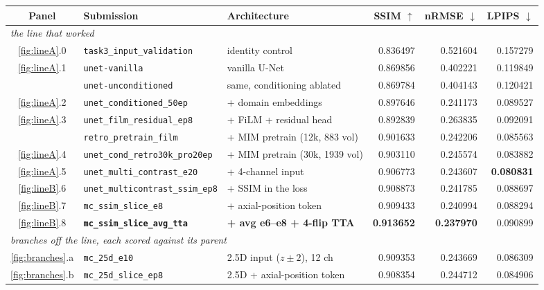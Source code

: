\documentclass[10pt,a4paper]{article}
\begin{document}
\begin{table}[H]
\centering
\small\setlength{\tabcolsep}{4pt}
\begin{tabular}{cllrrr}
\toprule
Panel & Submission & Architecture & SSIM $\uparrow$ & nRMSE $\downarrow$ & LPIPS $\downarrow$ \\
\midrule
\multicolumn{6}{l}{\itshape the line that worked} \\
\ref{fig:lineA}.0 & \texttt{task3\_input\_validation}      & identity control                & 0.836497 & 0.521604 & 0.157279 \\
\ref{fig:lineA}.1 & \texttt{unet-vanilla}                  & vanilla U-Net                   & 0.869856 & 0.402221 & 0.119849 \\
    & \texttt{unet-unconditioned}            & same, conditioning ablated      & 0.869784 & 0.404143 & 0.120421 \\
\ref{fig:lineA}.2 & \texttt{unet\_conditioned\_50ep}       & + domain embeddings             & 0.897646 & 0.241173 & 0.089527 \\
\ref{fig:lineA}.3 & \texttt{unet\_film\_residual\_ep8}     & + FiLM + residual head          & 0.892839 & 0.263835 & 0.092091 \\
    & \texttt{retro\_pretrain\_film}         & + MIM pretrain (12k, 883 vol)   & 0.901633 & 0.242206 & 0.085563 \\
\ref{fig:lineA}.4 & \texttt{unet\_cond\_retro30k\_pro20ep} & + MIM pretrain (30k, 1939 vol)  & 0.903110 & 0.245574 & 0.083882 \\
\ref{fig:lineA}.5 & \texttt{unet\_multi\_contrast\_e20}    & + 4-channel input               & 0.906773 & 0.243607 & \textbf{0.080831} \\
\ref{fig:lineB}.6 & \texttt{unet\_multicontrast\_ssim\_ep8}& + SSIM in the loss              & 0.908873 & 0.241785 & 0.088697 \\
\ref{fig:lineB}.7 & \texttt{mc\_ssim\_slice\_e8}           & + axial-position token          & 0.909433 & 0.240994 & 0.088294 \\
\ref{fig:lineB}.8 & \textbf{\texttt{mc\_ssim\_slice\_avg\_tta}} & \textbf{+ avg e6--e8 + 4-flip TTA} & \textbf{0.913652} & \textbf{0.237970} & 0.090899 \\
\midrule
\multicolumn{6}{l}{\itshape branches off the line, each scored against its parent} \\
\ref{fig:branches}.a & \texttt{mc\_25d\_e10}                  & 2.5D input ($z\pm2$), 12 ch     & 0.909353 & 0.243669 & 0.086309 \\
\ref{fig:branches}.b & \texttt{mc\_25d\_slice\_ep8}           & 2.5D + axial-position token     & 0.908354 & 0.244712 & 0.084906 \\

\end{tabular}
\end{table}
\end{document}
